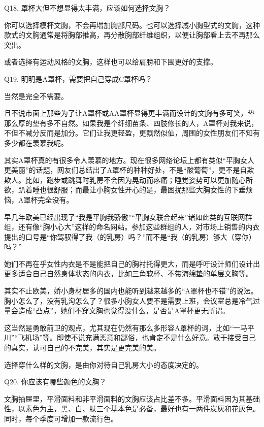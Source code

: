 \documentclass[12pt,UTF8]{ctexbook}
\begin{document}
Q18. 罩杯大但不想显得太丰满，应该如何选择文胸？


你可以选择模杯文胸，不会再增加胸部尺码。也可以选择减小胸型式的文胸，这种款式的文胸通常是将胸部推高，再分散胸部纤维组织，以便让胸部看上去不再那么突出。

或者选择有运动风格的文胸，这样也可以给肩膀和下围更好的支撑。





Q19. 明明是A罩杯，需要把自己穿成C罩杯吗？


当然是完全不需要。

且不说市面上那些为了让A罩杯或AA罩杯显得更丰满而设计的文胸有多可笑，垫那么厚的垫有多不自然。如果我是个纤细苗条、四肢修长的人，A罩杯对我来说，不但不减分反而是加分。它们让我更轻盈，更飘然似仙，周围的女性朋友们不知有多少都在羡慕我呢。

其实A罩杯真的有很多令人羡慕的地方。现在很多网络论坛上都有类似“平胸女人更美丽”的话题，网友们总结出了A罩杯的种种好处，不是“酸葡萄”，更不是自欺欺人。比如，跑步或跳舞时乳房不会因为晃动而疼痛；睡觉姿势可以更加随心所欲，趴着睡也很舒服；而最让小胸女性开心的是，最困扰那些大胸女性的下垂烦恼，A罩杯完全没有。

早几年欧美已经出现了“我是平胸我骄傲”“平胸女联合起来”诸如此类的互联网群组，还有像“胸小心大”这样的命名网站。参加这些群组的人，对市场上销售的内衣提出的口号是“你驾驭得了我（的乳房）吗？”而不是“我（的乳房）够大（穿你）吗？”

她们不再在乎女性内衣是不是能把自己的胸衬托得更大，而是呼吁设计师们设计出更多适合自己自然身体状态的内衣，比如三角软杯、不带海绵垫的单层文胸等。

其实不止欧美，娇小身材居多的国内也能听到越来越多的“A罩杯也不错”的说法。胸小怎么了，没有乳沟怎么了？很多小胸女人要不是需要上班，会议室总是冷气过量会造成“凸点”，她们不穿文胸也觉得没什么，是否是A罩杯更无所谓。

这当然是勇敢前卫的观点，尤其现在仍然有那么多形容A罩杯的词，比如“一马平川”“飞机场”等。即使不说充满恶意和鄙俗，也肯定不是什么好意。敢于接受自己的真实，认可自己的不完美，其实是更完美的美。

选择穿什么样的文胸，是由你对待自己乳房大小的态度决定的。





Q20. 你应该有哪些颜色的文胸？


文胸抽屉里，平滑面料和非平滑面料的文胸应该占比差不多。平滑面料因为其基础性，以素色为主，黑、白、肤三个基本色是必备，最好也有一两件炭灰和花灰色。同时，每个季度可增加一款流行色。
\end{document}
